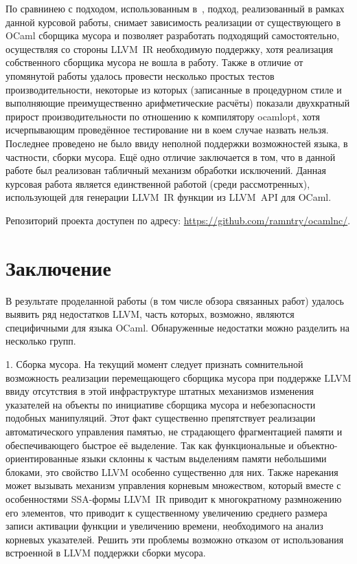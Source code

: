 \documentclass[a4paper, 12pt]{article}
\begin{document}
По сравнинею с подходом, использованным в~\cite{Benner}, подход, реализованный в рамках данной курсовой работы,
снимает зависимость реализации от существующего в OCaml сборщика мусора и позволяет разработать подходящий
самостоятельно, осуществляя со стороны LLVM~IR необходимую поддержку, хотя реализация собственного сборщика мусора не
вошла в работу. Также в отличие от упомянутой работы удалось провести несколько простых тестов производительности,
некоторые из которых (записанные в процедурном стиле и выполняющие преимущественно арифметические расчёты) показали
двухкратный прирост производительности по отношению к компилятору ocamlopt, хотя исчерпывающим проведённое тестирование
ни в коем случае назвать нельзя. Последнее проведено не было ввиду неполной поддержки возможностей языка, в
частности, сборки мусора. Ещё одно отличие заключается в том, что в данной работе был реализован табличный механизм
обработки исключений. Данная курсовая работа является единственной работой (среди рассмотренных), использующей для
генерации LLVM~IR функции из LLVM~API для OCaml.

Репозиторий проекта доступен по адресу: \url{https://github.com/ramntry/ocamlnc/}.

\newpage
\section*{Заключение}

В результате проделанной работы (в том числе обзора связанных работ) удалось выявить ряд недостатков LLVM, часть
которых, возможно, являются специфичными для языка OCaml. Обнаруженные недостатки можно разделить на несколько групп.

1. Сборка мусора.
На текущий момент следует признать сомнительной возможность реализации перемещающего сборщика мусора при поддержке
LLVM ввиду отсутствия в этой инфраструктуре штатных механизмов изменения указателей на объекты по инициативе сборщика
мусора и небезопасности подобных манипуляций. Этот факт существенно препятствует
реализации автоматического управления памятью, не страдающего фрагментацией памяти и обеспечивающего быстрое её
выделение. Так как функциональные и объектно-ориентированные языки склонны к частым выделениям памяти небольшими
блоками, это свойство LLVM особенно существенно для них. Также нарекания может вызывать механизм управления корневым
множеством, который вместе с особенностями SSA-формы LLVM~IR приводит к многократному размножению его элементов, что
приводит к существенному увеличению среднего размера записи активации функции и увеличению времени, необходимого на
анализ корневых указателей. Решить эти проблемы возможно отказом от использования встроенной в LLVM поддержки сборки
мусора.
\end{document}
